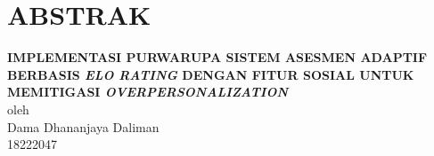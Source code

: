 \chapter*{ABSTRAK}

\begin{center}
    \textbf{IMPLEMENTASI PURWARUPA SISTEM ASESMEN ADAPTIF BERBASIS \textit{ELO RATING} DENGAN FITUR SOSIAL UNTUK MEMITIGASI \textit{OVERPERSONALIZATION}} \\
    \vspace{0.4cm}
    oleh \\
    \vspace{0.4cm}
    Dama Dhananjaya Daliman\\
    18222047\\
\end{center}

